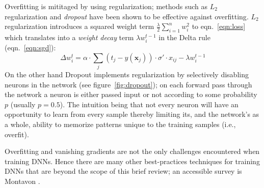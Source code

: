 Overfitting is mititaged by using regularization; methods such as \(L_2\) regularization and \textit{dropout} have been shown to be effective against overfitting\cite{bengio2013}.
%
\(L_2\) regularization introduces a squared weight term \(\frac{\lambda}{2}\sum_{i=1}^n w_i^2\) to eqn.~\eqref{eqn:loss} which translates into a \textit{weight decay} term \(\lambda w_i^{t-1}\) in the Delta rule (eqn.~\eqref{eqn:sgd}):
\begin{equation}
    \Delta w_i^t = \alpha \cdot \sum_j (t_j-y(\mathbf{x}_j))\cdot \sigma'\cdot x_{ij} - \lambda w_i^{t-1}
    \label{eqn:weightdecaydelta}
\end{equation}
On the other hand Dropout implements regularization by selectively disabling neurons in the network (see figure~\ref{fig:dropout}); on each forward pass through the network a neuron is either passed input or not according to some probability \(p\) (usually \(p = 0.5\)).
%
The intuition being that not every neuron will have an opportunity to learn from every sample thereby limiting its, and the network's as a whole, ability to memorize patterns unique to the training samples (i.e., overfit).

Overfitting and vanishing gradients are not the only challenges encountered when training DNNs.
%
Hence there are many other best-practices techniques for training DNNs that are beyond the scope of this brief review; an accessible survey is Montavon \etal\cite{montavon2012neural}.
